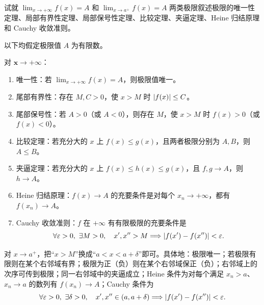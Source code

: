 \begin{xthought}[1]
试就 $\lim_{x\to+\infty}f(x)=A$ 和 $\lim_{x\to a^+}f(x)=A$ 两类极限叙述极限的唯一性定理、局部有界性定理、局部保号性定理、比较定理、夹逼定理、Heine 归结原理和 Cauchy 收敛准则。
\end{xthought}
\begin{xsolution}
以下均假定极限值 $A$ 为有限数。

对 $\boldsymbol{x\to+\infty}$：
\begin{enumerate}
  \item 唯一性：若 $\lim_{x\to+\infty}f(x)=A$，则极限值唯一。
  \item 尾部有界性：存在 $M,C>0$，使 $x>M$ 时 $\lvert f(x)\rvert\leq C$。
  \item 尾部保号性：若 $A>0$（或 $A<0$），则存在 $M$，使 $x>M$ 时 $f(x)>0$（或 $f(x)<0$）。
  \item 比较定理：若充分大的 $x$ 上 $f(x)\leq g(x)$，且两者极限分别为 $A,B$，则 $A\leq B$。
  \item 夹逼定理：若充分大的 $x$ 上 $f(x)\leq h(x)\leq g(x)$，且 $f,g\to A$，则 $h\to A$。
  \item Heine 归结原理：$f(x)\to A$ 的充要条件是对每个 $x_n\to+\infty$，都有 $f(x_n)\to A$。
  \item Cauchy 收敛准则：$f$ 在 $+\infty$ 有有限极限的充要条件是
  \[
    \forall\varepsilon>0,\ \exists M>0,\quad x',x''>M
    \Longrightarrow\lvert f(x')-f(x'')\rvert<\varepsilon.
  \]
\end{enumerate}

对 $x\to a^+$，把“$x>M$”换成“$a<x<a+\delta$”即可。具体地：极限唯一；若极限有限则在某个右邻域有界；极限为正（负）则在某个右邻域保正（负）；右邻域上的次序可传到极限；同一右邻域中的夹逼成立；Heine 条件为对每个满足 $x_n>a$、$x_n\to a$ 的数列有 $f(x_n)\to A$；Cauchy 条件为
\[
  \forall\varepsilon>0,\ \exists\delta>0,\quad
  x',x''\in(a,a+\delta)
  \Longrightarrow\abs{f(x')-f(x'')}<\varepsilon.
\]
\end{xsolution}


